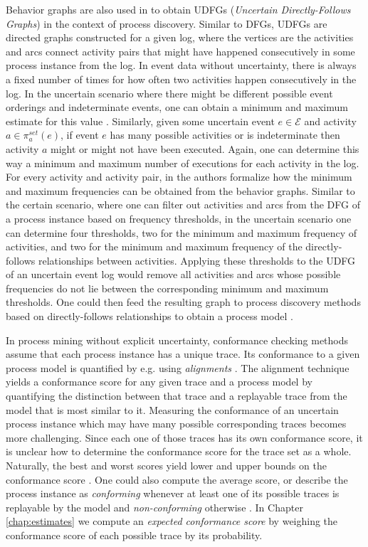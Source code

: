 Behavior graphs are also used in \cite{discovery} to obtain UDFGs (\textit{Uncertain Directly-Follows Graphs}) in the context of process discovery.
Similar to DFGs, UDFGs are directed graphs constructed for a given log, where the vertices are the activities and arcs connect activity pairs that might have happened consecutively in some process instance from the log.
In event data without uncertainty, there is always a fixed number of times for how often two activities happen consecutively in the log. 
In the uncertain scenario where there might be different possible event orderings and indeterminate events, one can obtain a minimum and maximum estimate for this value \cite{discovery}.
Similarly, given some uncertain event $e \in \mathcal{E}$ and activity $a \in \pi_a^{set}(e)$, if event $e$ has many possible activities or is indeterminate then activity $a$ might or might not have been executed.
Again, one can determine this way a minimum and maximum number of executions for each activity in the log.
For every activity and activity pair, in \cite{discovery} the authors formalize how the minimum and maximum frequencies can be obtained from the behavior graphs.
Similar to the certain scenario, where one can filter out activities and arcs from the DFG of a process instance based on frequency thresholds, in  the uncertain scenario one can determine four thresholds, two for the minimum and maximum frequency of activities, and two for the minimum and maximum frequency of the directly-follows relationships between activities.
Applying these thresholds to the UDFG of an uncertain event log would remove all activities and arcs whose possible frequencies do not lie between the corresponding minimum and maximum thresholds.
One could then feed the resulting graph to process discovery methods based on directly-follows relationships to obtain a process model \cite{discovery}.


In process mining without explicit uncertainty, conformance checking methods assume that each process instance has a unique trace.
Its conformance to a given process model is quantified by e.g. using \textit{alignments} \cite{alignment}.
The alignment technique yields a conformance score for any given trace and a process model by quantifying the distinction between that trace and a replayable trace from the model that is most similar to it.
Measuring the conformance of an uncertain process instance which may have many possible corresponding traces becomes more challenging.
Since each one of those traces has its own conformance score, it is unclear how to determine the conformance score for the trace set as a whole.
Naturally, the best and worst scores yield lower and upper bounds on the conformance score \cite{conformance}.
One could also compute the average score, or describe the process instance as \textit{conforming} whenever at least one of its possible traces is replayable by the model and \textit{non-conforming} otherwise \cite{por}.
In Chapter \ref{chap:estimates} we compute an \textit{expected conformance score} by weighing the conformance score of each possible trace by its probability.

